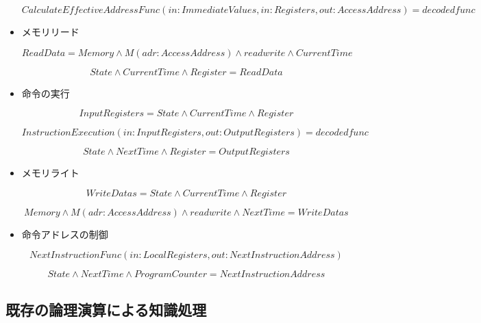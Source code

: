 \documentclass[12pt]{article}
\begin{document}
\begin{itemize}
  \begin{equation} CalculateEffectiveAddressFunc(in:ImmediateValues,in:Registers,out:AccessAddress)=decodedfunc \end{equation}
\item
  メモリリード

  \begin{equation} ReadData = Memory \wedge M(adr:AccessAddress) \wedge readwrite \wedge CurrentTime\end{equation}

  \begin{equation} State \wedge CurrentTime \wedge Register = ReadData\end{equation}
\item
  命令の実行

  \begin{equation} InputRegisters = State \wedge CurrentTime \wedge Register \end{equation}

  \begin{equation} InstructionExecution(in:InputRegisters,out:OutputRegisters)= decodedfunc\end{equation}

  \begin{equation} State \wedge NextTime \wedge Register = OutputRegisters\end{equation}
\item
  メモリライト

  \begin{equation} WriteDatas = State \wedge CurrentTime \wedge Register \end{equation}

  \begin{equation} Memory \wedge M(adr:AccessAddress) \wedge readwrite \wedge NextTime = WriteDatas \end{equation}
\item
  命令アドレスの制御

  \begin{equation}  NextInstructionFunc(in:LocalRegisters,out:NextInstructionAddress)\end{equation}

  \begin{equation} State \wedge NextTime \wedge ProgramCounter  = NextInstructionAddress \end{equation}
\end{itemize}

\subsection{既存の論理演算による知識処理}\label{ux65e2ux5b58ux306eux8ad6ux7406ux6f14ux7b97ux306bux3088ux308bux77e5ux8b58ux51e6ux7406}
\end{document}
